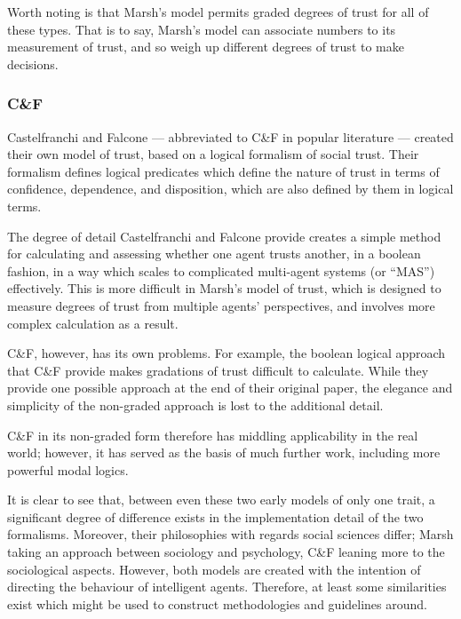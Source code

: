 Worth noting is that Marsh's model permits graded degrees of trust for all of these types. That is to say, Marsh's model can associate numbers to its measurement of trust, and so weigh up different degrees of trust to make decisions.\par

\subsubsection*{C\&F}\label{sec:cnf}
Castelfranchi and Falcone\cite{Castelfranchi2001} --- abbreviated to C\&F in popular literature --- created their own model of trust, based on a logical formalism of social trust. Their formalism defines logical predicates which define the nature of trust in terms of confidence, dependence, and disposition, which are also defined by them in logical terms.\par

The degree of detail Castelfranchi and Falcone provide creates a simple method for calculating and assessing whether one agent trusts another, in a boolean fashion, in a way which scales to complicated multi-agent systems (or ``MAS'') effectively. This is more difficult in Marsh's model of trust, which is designed to measure degrees of trust from multiple agents' perspectives, and involves more complex calculation as a result.\par

C\&F, however, has its own problems. For example, the boolean logical approach that C\&F provide makes gradations of trust difficult to calculate. While they provide one possible approach at the end of their original paper, the elegance and simplicity of the non-graded approach is lost to the additional detail.\par

C\&F in its non-graded form therefore has middling applicability in the real world; however, it has served as the basis of much further work\cite{Herzig2009}, including more powerful modal logics.\cite{kramdi}\par

It is clear to see that, between even these two early models of only one trait, a significant degree of difference exists in the implementation detail of the two formalisms. Moreover, their philosophies with regards social sciences differ; Marsh taking an approach between sociology and psychology, C\&F leaning more to the sociological aspects. However, both models are created with the intention of directing the behaviour of intelligent agents. Therefore, at least some similarities exist which might be used to construct methodologies and guidelines around.\par

